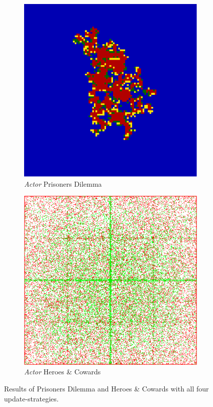 \begin{figure}
    \begin{subfigure}[b]{0.4\textwidth}
		\centering
       	\includegraphics[width=.7\textwidth, angle=0]{./fig/act_99x99_436steps_MSG_haskell.png}
        \caption{\textit{Actor} Prisoners Dilemma}
        \label{fig:pd_act}
    \end{subfigure}  
    \begin{subfigure}[b]{0.4\textwidth}
    	\centering
        \includegraphics[width=.7\textwidth, angle=0]{./fig/act_HAC_100_000_500steps_scala.png}
        \caption{\textit{Actor} Heroes \& Cowards}
        \label{fig:hac_act}
    \end{subfigure}
        
	\caption{\small Results of Prisoners Dilemma and Heroes \& Cowards with all four update-strategies.} 
	\label{fig:results}
\end{figure}
    
